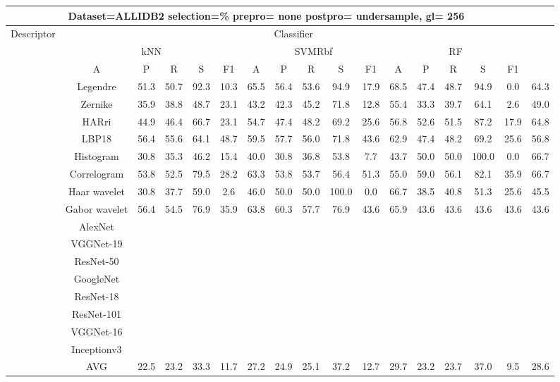 \documentclass[12pt,italian]{article}
\begin{document}
\begin{tiny}
\begin{longtable}{lcccccccccccccccc}
\toprule
\multicolumn{16}{c}{Dataset=ALLIDB2 selection=\% prepro= none postpro= undersample, gl= 256} \\ 
\toprule
Descriptor & \multicolumn{15}{c}{Classifier} \\ 
& \multicolumn{5}{c}{kNN} & \multicolumn{5}{c}{SVMRbf} & \multicolumn{5}{c}{RF} \\ 
& A & P & R & S & F1 & A & P & R & S & F1 & A & P & R & S & F1 \\ 
\midrule
& Legendre & 51.3 & 50.7 & 92.3 & 10.3 & 65.5 & 56.4 & 53.6 & 94.9 & 17.9 & 68.5 & 47.4 & 48.7 & 94.9 &  0.0 & 64.3 \\ 
& Zernike & 35.9 & 38.8 & 48.7 & 23.1 & 43.2 & 42.3 & 45.2 & 71.8 & 12.8 & 55.4 & 33.3 & 39.7 & 64.1 &  2.6 & 49.0 \\ 
& HARri & 44.9 & 46.4 & 66.7 & 23.1 & 54.7 & 47.4 & 48.2 & 69.2 & 25.6 & 56.8 & 52.6 & 51.5 & 87.2 & 17.9 & 64.8 \\ 
& LBP18 & 56.4 & 55.6 & 64.1 & 48.7 & 59.5 & 57.7 & 56.0 & 71.8 & 43.6 & 62.9 & 47.4 & 48.2 & 69.2 & 25.6 & 56.8 \\ 
& Histogram & 30.8 & 35.3 & 46.2 & 15.4 & 40.0 & 30.8 & 36.8 & 53.8 &  7.7 & 43.7 & 50.0 & 50.0 & 100.0 &  0.0 & 66.7 \\ 
& Correlogram & 53.8 & 52.5 & 79.5 & 28.2 & 63.3 & 53.8 & 53.7 & 56.4 & 51.3 & 55.0 & 59.0 & 56.1 & 82.1 & 35.9 & 66.7 \\ 
& Haar wavelet & 30.8 & 37.7 & 59.0 &  2.6 & 46.0 & 50.0 & 50.0 & 100.0 &  0.0 & 66.7 & 38.5 & 40.8 & 51.3 & 25.6 & 45.5 \\ 
& Gabor wavelet & 56.4 & 54.5 & 76.9 & 35.9 & 63.8 & 60.3 & 57.7 & 76.9 & 43.6 & 65.9 & 43.6 & 43.6 & 43.6 & 43.6 & 43.6 \\ 
& AlexNet \\ 
& VGGNet-19 \\ 
& ResNet-50 \\ 
& GoogleNet \\ 
& ResNet-18 \\ 
& ResNet-101 \\ 
& VGGNet-16 \\ 
& Inceptionv3 \\ 
\hline
& AVG & 22.5 & 23.2 & 33.3 & 11.7 & 27.2 & 24.9 & 25.1 & 37.2 & 12.7 & 29.7 & 23.2 & 23.7 & 37.0 &  9.5 & 28.6 \\ 
\hline
\bottomrule
\end{longtable} 


\end{tiny}
\end{document}
